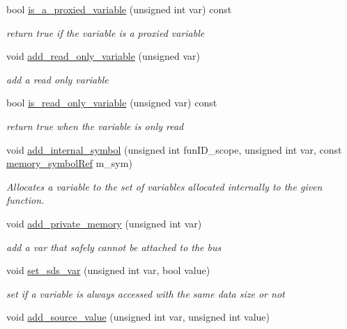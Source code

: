 \begin{DoxyCompactItemize}
bool \hyperlink{classmemory_ad42c0543068efe731b71267f869fefcf}{is\+\_\+a\+\_\+proxied\+\_\+variable} (unsigned int var) const
\begin{DoxyCompactList}\small\item\em return true if the variable is a proxied variable \end{DoxyCompactList}\item 
void \hyperlink{classmemory_a626219c7688337cb254b4586af7aaeac}{add\+\_\+read\+\_\+only\+\_\+variable} (unsigned var)
\begin{DoxyCompactList}\small\item\em add a read only variable \end{DoxyCompactList}\item 
bool \hyperlink{classmemory_a95592389e09c170738164d64ef46aacb}{is\+\_\+read\+\_\+only\+\_\+variable} (unsigned var) const
\begin{DoxyCompactList}\small\item\em return true when the variable is only read \end{DoxyCompactList}\item 
void \hyperlink{classmemory_ae4d01a6e84a8701b3b04432f3c173212}{add\+\_\+internal\+\_\+symbol} (unsigned int fun\+I\+D\+\_\+scope, unsigned int var, const \hyperlink{memory__symbol_8hpp_af3608dbc27177447c2d777fa712cc82a}{memory\+\_\+symbol\+Ref} m\+\_\+sym)
\begin{DoxyCompactList}\small\item\em Allocates a variable to the set of variables allocated internally to the given function. \end{DoxyCompactList}\item 
void \hyperlink{classmemory_a15d9eb23dfbab98d05a5075f1230c3e0}{add\+\_\+private\+\_\+memory} (unsigned int var)
\begin{DoxyCompactList}\small\item\em add a var that safely cannot be attached to the bus \end{DoxyCompactList}\item 
void \hyperlink{classmemory_a097988cba137c2de02ce55b9a62bf8f7}{set\+\_\+sds\+\_\+var} (unsigned int var, bool value)
\begin{DoxyCompactList}\small\item\em set if a variable is always accessed with the same data size or not \end{DoxyCompactList}\item 
void \hyperlink{classmemory_a3a39a28a6df6b3815a2fa061bb943ceb}{add\+\_\+source\+\_\+value} (unsigned int var, unsigned int value)

\end{DoxyCompactItemize}
